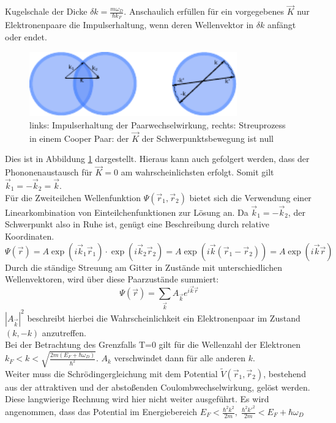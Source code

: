 Kugelschale der Dicke $\delta k = \frac{m \omega_D}{\hbar k_F}$. Anschaulich 
erfüllen für ein vorgegebenes $\vec{K}$ nur Elektronenpaare die Impulserhaltung,
wenn deren Wellenvektor in $\delta k$ anfängt oder endet. 
\begin{figure}[h]
	\centering
	\includegraphics[width=0.8\textwidth]{Abb/cooperstreu.pdf}
	\caption{links: Impulserhaltung der Paarwechselwirkung, rechts: Streuprozess in
			 einem Cooper Paar: der $\vec{K}$ der Schwerpunktsbewegung ist null}
	\label{streucooper}
\end{figure}
Dies ist in Abbildung \ref{streucooper} dargestellt. Hieraus kann auch gefolgert 
werden, dass der Phononenaustausch für $\vec{K}=0$ am wahrscheinlichsten erfolgt.
Somit gilt $\vec{k}_1 = - \vec{k}_2 = \vec{k}$.\\
Für die Zweiteilchen Wellenfunktion $\Psi (\vec{r}_1,\vec{r}_2)$ bietet sich die 
Verwendung einer Linearkombination von Einteilchenfunktionen zur Lösung an. Da 
$\vec{k}_1 = - \vec{k}_2$, der Schwerpunkt also in Ruhe ist, genügt eine 
Beschreibung durch relative Koordinaten. 
\[
	\Psi ( \vec{r} ) = A \exp ( i \vec{k}_1 \vec{r}_1 ) \cdot \exp( i \vec{k}_2
					   \vec{r}_2) 
					 = A \exp( i \vec{k} ( \vec{r}_1 - \vec{r}_2 ))
					 = A \exp(i \vec{k} \vec{r} )
\]
Durch die ständige Streuung am Gitter in Zustände mit unterschiedlichen 
Wellenvektoren, wird über diese Paarzustände summiert:
\[
	\Psi (\vec{r}) = \sum_{\vec{k}} A_{\vec{k}} e^{i \vec{k} \vec{r}}
\]
$| A_{\vec{k}} |^2$ beschreibt hierbei die Wahrscheinlichkeit ein Elektronenpaar
im Zustand $(k,-k)$ anzutreffen.\\
Bei der Betrachtung des Grenzfalls T=0 gilt für die Wellenzahl der Elektronen 
$\displaystyle k_F < k < \sqrt{\frac{2m(E_F + \hbar \omega_D)}{\hbar^2}}$. $A_k$ 
verschwindet dann für alle anderen $k$.\\
Weiter muss die Schrödingergleichung mit dem Potential $\tilde{V}(\vec{r}_1,
\vec{r}_2)$, bestehend aus der attraktiven und der abstoßenden 
Coulombwechselwirkung, gelöst werden. Diese langwierige Rechnung wird hier nicht 
weiter ausgeführt. Es wird angenommen, dass das Potential im Energiebereich
$E_F < \frac{\hbar^2 k^2}{2m}, \; \frac{\hbar^2 k'^2}{2m} < E_F + \hbar \omega_D$
